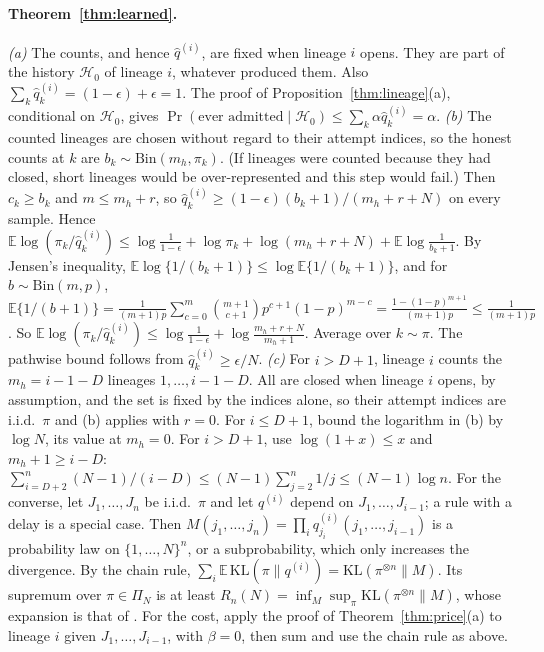\paragraph{Theorem~\ref{thm:learned}.}
\emph{(a)} The counts, and hence $\hat q^{(i)}$, are fixed when lineage $i$ opens. They are part of the history $\mathcal H_0$ of lineage $i$, whatever produced them. Also $\sum_k\hat q^{(i)}_k=(1-\epsilon)+\epsilon=1$. The proof of Proposition~\ref{thm:lineage}(a), conditional on $\mathcal H_0$, gives $\Pr(\text{ever admitted}\mid\mathcal H_0)\le\sum_k\alpha\hat q^{(i)}_k=\alpha$.
\emph{(b)} The counted lineages are chosen without regard to their attempt indices, so the honest counts at $k$ are $b_k\sim\mathrm{Bin}(m_h,\pi_k)$. (If lineages were counted because they had closed, short lineages would be over-represented and this step would fail.) Then $c_k\ge b_k$ and $m\le m_h+r$, so $\hat q^{(i)}_k\ge(1-\epsilon)(b_k+1)/(m_h+r+N)$ on every sample. Hence
$\mathbb E\log(\pi_k/\hat q^{(i)}_k)\le\log\frac1{1-\epsilon}+\log\pi_k+\log(m_h+r+N)+\mathbb E\log\frac1{b_k+1}$.
By Jensen's inequality, $\mathbb E\log\{1/(b_k+1)\}\le\log\mathbb E\{1/(b_k+1)\}$, and for $b\sim\mathrm{Bin}(m,p)$,
$\mathbb E\{1/(b+1)\}=\frac1{(m+1)p}\sum_{c=0}^m\binom{m+1}{c+1}p^{c+1}(1-p)^{m-c}=\frac{1-(1-p)^{m+1}}{(m+1)p}\le\frac1{(m+1)p}$.
So $\mathbb E\log(\pi_k/\hat q^{(i)}_k)\le\log\frac1{1-\epsilon}+\log\frac{m_h+r+N}{m_h+1}$. Average over $k\sim\pi$. The pathwise bound follows from $\hat q^{(i)}_k\ge\epsilon/N$.
\emph{(c)} For $i>D+1$, lineage $i$ counts the $m_h=i-1-D$ lineages $1,\dots,i-1-D$. All are closed when lineage $i$ opens, by assumption, and the set is fixed by the indices alone, so their attempt indices are i.i.d.\ $\pi$ and (b) applies with $r=0$. For $i\le D+1$, bound the logarithm in (b) by $\log N$, its value at $m_h=0$. For $i>D+1$, use $\log(1+x)\le x$ and $m_h+1\ge i-D$: $\sum_{i=D+2}^n(N-1)/(i-D)\le(N-1)\sum_{j=2}^n1/j\le(N-1)\log n$. For the converse, let $J_1,\dots,J_n$ be i.i.d.\ $\pi$ and let $q^{(i)}$ depend on $J_1,\dots,J_{i-1}$; a rule with a delay is a special case. Then $M(j_1,\dots,j_n)=\prod_iq^{(i)}_{j_i}(j_1,\dots,j_{i-1})$ is a probability law on $\{1,\dots,N\}^n$, or a subprobability, which only increases the divergence. By the chain rule, $\sum_i\mathbb E\,\mathrm{KL}(\pi\|q^{(i)})=\mathrm{KL}(\pi^{\otimes n}\|M)$. Its supremum over $\pi\in\Pi_N$ is at least $R_n(N)=\inf_M\sup_\pi\mathrm{KL}(\pi^{\otimes n}\|M)$, whose expansion is that of \citet{xie1997minimax} \citep[see also][Theorem~2]{boucheron2009coding}. For the cost, apply the proof of Theorem~\ref{thm:price}(a) to lineage $i$ given $J_1,\dots,J_{i-1}$, with $\beta=0$, then sum and use the chain rule as above.


